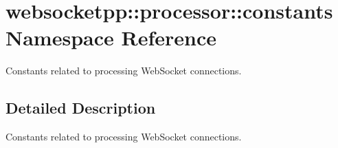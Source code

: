 \hypertarget{namespacewebsocketpp_1_1processor_1_1constants}{}\section{websocketpp\+:\+:processor\+:\+:constants Namespace Reference}
\label{namespacewebsocketpp_1_1processor_1_1constants}


Constants related to processing Web\+Socket connections.  




\subsection{Detailed Description}
Constants related to processing Web\+Socket connections. 